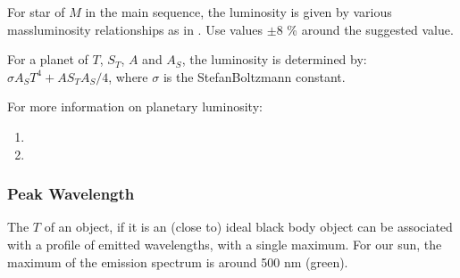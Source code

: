 \documentclass[letterpaper,10pt,english]{sphinxmanual}
\begin{document}
\sphinxAtStartPar
For star of {\hyperref[\detokenize{quantities/material/mass:id1}]{}} \(M\) in the main sequence, the luminosity
is given by various mass\sphinxhyphen{}luminosity relationships as in .
Use values \(\pm 8\) \% around the suggested value.

\sphinxAtStartPar
For a planet of {\hyperref[\detokenize{quantities/surface/emission/temperature:id1}]{}} \(T\),
{\hyperref[\detokenize{quantities/surface/emission/incident_flux:id1}]{}} \(S_T\),
{\hyperref[\detokenize{quantities/surface/emission/albedo:id1}]{}} \(A\) and {\hyperref[\detokenize{quantities/geometric/surface_area:id1}]{}} \(A_S\),
the luminosity is determined by:
\(\sigma A_S T ^ 4 + A S_T A_S / 4\),
where \(\sigma\) is the Stefan\sphinxhyphen{}Boltzmann constant.

\sphinxAtStartPar
For more information on planetary luminosity:
\begin{enumerate}
%
\item {} 
\sphinxAtStartPar
{}

\item {} 
\sphinxAtStartPar
{}

\end{enumerate}


\subsubsection{Peak Wavelength}
\label{\detokenize{quantities/surface/emission/peak_wavelength:peak-wavelength}}\label{\detokenize{quantities/surface/emission/peak_wavelength::doc}}\label{\detokenize{quantities/surface/emission/peak_wavelength:id1}}
\sphinxAtStartPar
The {\hyperref[\detokenize{quantities/surface/emission/temperature:id1}]{}} \(T\) of an object,
if it is an (close to) ideal black body object can be associated with
a profile of emitted wavelengths, with a single maximum.
For our sun, the maximum of the emission spectrum is around 500 nm (green).
\end{document}
